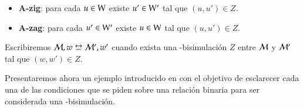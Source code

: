 \begin{definicion}
\begin{itemize}
        \item \textbf{A-zig}: para cada $u \in \mathrm{W}$ existe $u' \in \mathrm{W}'$ tal que $(u,u') \in Z$.

        \item \textbf{A-zag}: para cada $u' \in \mathrm{W}'$ existe $u \in \mathrm{W}$ tal que $(u,u') \in Z$.
    \end{itemize} 

    Escribiremos $\modults,w \bisim \modults',w'$ cuando exista una \KHilogic-bisimulación $Z$ entre
    $\mathcal{M}$ y $\mathcal{M}'$ tal que $(w,w') \in Z$.
\end{definicion}

Presentaremos ahora un ejemplo introducido en \cite{SaraviaPHD} con el objetivo de esclarecer cada una de las condiciones 
que se piden sobre una relación binaria para ser considerada una \KHilogic-bisimulación. 

